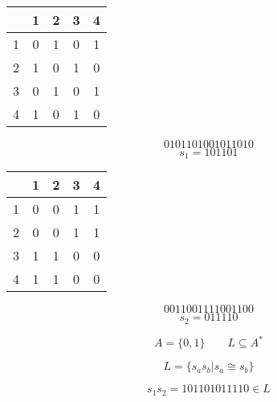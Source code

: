\documentclass{IEEEtran}
\begin{document}
\vspace{2mm}

\begin{center}
\begin{tabular}{ c|cccc } 
  & 1 & 2 & 3 & 4 \\
 \hline
 1 & 0 & 1 & 0 & 1 \\ 
 2 & 1 & 0 & 1 & 0 \\ 
 3 & 0 & 1 & 0 & 1 \\ 
 4 & 1 & 0 & 1 & 0 \\ 
\end{tabular}
\end{center}

\[0101 1010 0101 1010\]
\[s_1 = 101 10 1 \]

\vspace{2mm}

\begin{center}
\begin{tabular}{ c|cccc } 
  & 1 & 2 & 3 & 4 \\
 \hline
 1 & 0 & 0 & 1 & 1 \\ 
 2 & 0 & 0 & 1 & 1 \\ 
 3 & 1 & 1 & 0 & 0 \\ 
 4 & 1 & 1 & 0 & 0 \\ 
\end{tabular}
\end{center}

\[0011 0011 1100 1100\]
\[s_2 = 011 11 0 \]

\[A = \{0,1\} \qquad L \subseteq A^*\]

\[L = \{ s_as_b | s_a \cong s_b \} \]

\[ s_1 s_2 = 101 10 1 011 11 0 \in L \]
\end{document}
